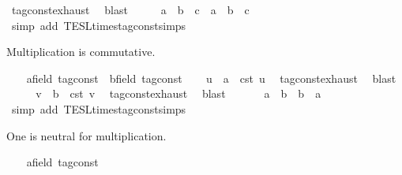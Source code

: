 \begin{isabellebody}
\ tag{\isacharunderscore}const{\isachardot}exhaust\ \isamarkupfalse%
\ blast\isanewline
\ \ \isamarkupfalse%
\ \isamarkupfalse%
\ {\isacartoucheopen}a\ {\isacharasterisk}\ b\ {\isacharasterisk}\ c\ {\isacharequal}\ a\ {\isacharasterisk}\ {\isacharparenleft}b\ {\isacharasterisk}\ c{\isacharparenright}{\isacartoucheclose}\isanewline
\ \ \ \ \isamarkupfalse%
\ {\isacharparenleft}simp\ add{\isacharcolon}\ TESL{\isachardot}times{\isacharunderscore}tag{\isacharunderscore}const{\isachardot}simps{\isacharparenright}\isanewline
{}\isamarkupfalse%
%
\begin{isamarkuptext}%
Multiplication is commutative.%
\end{isamarkuptext}\isamarkuptrue%
\ \ \isamarkupfalse%
\ a{\isacharcolon}{\isacharcolon}{\isacartoucheopen}{\isacharprime}{\isasymtau}{\isacharcolon}{\isacharcolon}field\ tag{\isacharunderscore}const{\isacartoucheclose}\ \ b{\isacharcolon}{\isacharcolon}{\isacartoucheopen}{\isacharprime}{\isasymtau}{\isacharcolon}{\isacharcolon}field\ tag{\isacharunderscore}const{\isacartoucheclose}\isanewline
\ \ \isamarkupfalse%
\ u\ \ {\isacartoucheopen}a\ {\isacharequal}\ {\isasymtau}\isactrlsub c\isactrlsub s\isactrlsub t\ u{\isacartoucheclose}\ \isamarkupfalse%
\ tag{\isacharunderscore}const{\isachardot}exhaust\ \isamarkupfalse%
\ blast\isanewline
\ \ \isamarkupfalse%
\ \isamarkupfalse%
\ v\ \ {\isacartoucheopen}b\ {\isacharequal}\ {\isasymtau}\isactrlsub c\isactrlsub s\isactrlsub t\ v{\isacartoucheclose}\ \isamarkupfalse%
\ tag{\isacharunderscore}const{\isachardot}exhaust\ \isamarkupfalse%
\ blast\isanewline
\ \ \isamarkupfalse%
\ \isamarkupfalse%
\ {\isacartoucheopen}\ a\ {\isacharasterisk}\ b\ {\isacharequal}\ b\ {\isacharasterisk}\ a{\isacartoucheclose}\isanewline
\ \ \ \ \isamarkupfalse%
\ {\isacharparenleft}simp\ add{\isacharcolon}\ TESL{\isachardot}times{\isacharunderscore}tag{\isacharunderscore}const{\isachardot}simps{\isacharparenright}\isanewline
{}\isamarkupfalse%
%
\begin{isamarkuptext}%
One is neutral for multiplication.%
\end{isamarkuptext}\isamarkuptrue%
\ \ \isamarkupfalse%
\ a{\isacharcolon}{\isacharcolon}{\isacartoucheopen}{\isacharprime}{\isasymtau}{\isacharcolon}{\isacharcolon}field\ tag{\isacharunderscore}const{\isacartoucheclose}\isanewline

\end{isabellebody}
